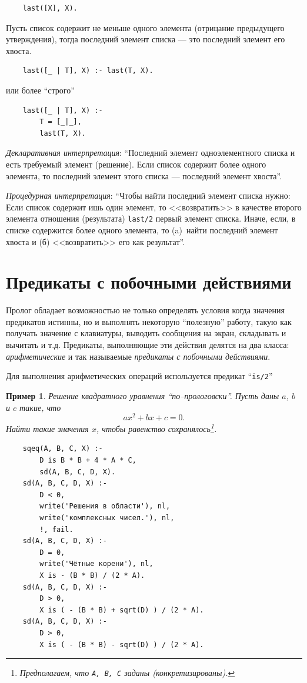 \documentclass[12pt, openany, twoside]{book} %
\newtheorem{example}{Пример}[chapter]
\begin{document}
{\tt\begin{verbatim}
    last([X], X).
\end{verbatim}}

Пусть список содержит не меньше одного элемента (отрицание предыдущего утверждения), тогда последний элемент списка --- это последний элемент его хвоста.

{\tt\begin{verbatim}
    last([_ | T], X) :- last(T, X).
\end{verbatim}}
\noindent или более ``строго''
{\tt\begin{verbatim}
    last([_ | T], X) :-
        T = [_|_],
        last(T, X).
\end{verbatim}}\emph{Декларативная интерпретация}: ``Последний элемент одноэлементного списка и есть требуемый элемент (решение). Если список содержит более одного элемента, то последний элемент этого списка --- последний элемент хвоста''.

\emph{Процедурная интерпретация}: ``Чтобы найти последний элемент списка нужно: Если список содержит ишь один элемент, то <<возвратить>> в качестве второго элемента отношения (результата) {\tt last/2} первый элемент списка. Иначе, если, в списке содержится более одного элемента, то (a)~найти последний элемент хвоста и (б) <<возвратить>> его как результат''.

\section{Предикаты с побочными действиями}
Пролог обладает возможностью не только определять условия когда значения предикатов истинны, но и выполнять некоторую ``полезную'' работу, такую как получать значение с клавиатуры, выводить сообщения на экран, складывать и вычитать и т.д. Предикаты, выполняющие эти действия делятся на два класса: {\em арифметические} и так называемые {\em предикаты с побочными действиями}.

Для выполнения арифметических операций используется предикат ``{\tt is/2}''
\begin{example}
Решение квадратного уравнения ``по--прологовски''. Пусть даны $a$, $b$ и $c$ такие, что
$$
    ax^2+bx+c=0.
$$
Найти такие значения $x$, чтобы равенство сохранялось\footnote{Предполагаем, что {\tt A, B, C} заданы (конкретизированы).}.
\end{example}
{\tt\begin{verbatim}
    sqeq(A, B, C, X) :-
        D is B * B + 4 * A * C,
        sd(A, B, C, D, X).
    sd(A, B, C, D, X) :-
        D < 0,
        write('Решения в области'), nl,
        write('комплексных чисел.'), nl,
        !, fail.
    sd(A, B, C, D, X) :-
        D = 0,
        write('Чётные корени'), nl,
        X is - (B * B) / (2 * A).
    sd(A, B, C, D, X) :-
        D > 0,
        X is ( - (B * B) + sqrt(D) ) / (2 * A).
    sd(A, B, C, D, X) :-
        D > 0,
        X is ( - (B * B) - sqrt(D) ) / (2 * A).
\end{verbatim}}
\end{document}

